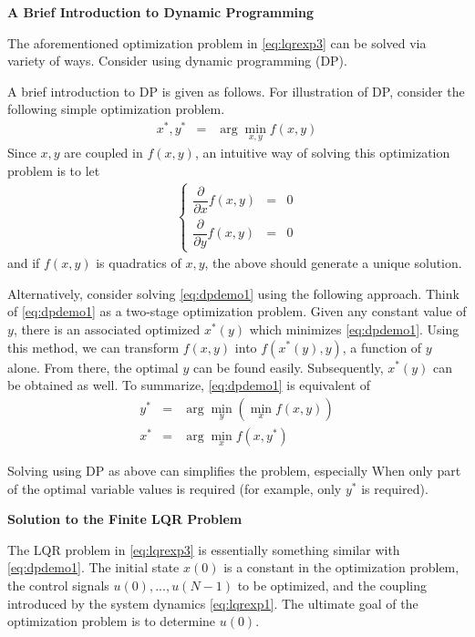 \vspace{0.1in}
\noindent \textbf{A Brief Introduction to Dynamic Programming}
\vspace{0.1in}

The aforementioned optimization problem in \eqref{eq:lqrexp3} can be solved via variety of ways. Consider using dynamic programming (DP).

A brief introduction to DP is given as follows. For illustration of DP, consider the following simple optimization problem.
\begin{eqnarray}
  x^*, y^* &=& \arg\min_{x,y} f(x, y) \label{eq:dpdemo1}
\end{eqnarray}
Since $x,y$ are coupled in $f(x,y)$, an intuitive way of solving this optimization problem is to let
\begin{eqnarray}
\left\{\begin{array}{ccc}
         \dfrac{\partial}{\partial x}f(x,y) & = & 0 \\
         \dfrac{\partial}{\partial y}f(x,y) & = & 0
       \end{array}\right. \nonumber
\end{eqnarray}
and if $f(x,y)$ is quadratics of $x, y$, the above should generate a unique solution.

Alternatively, consider solving \eqref{eq:dpdemo1} using the following approach. Think of \eqref{eq:dpdemo1} as a two-stage optimization problem. Given any constant value of $y$, there is an associated optimized $x^*(y)$ which minimizes \eqref{eq:dpdemo1}. Using this method, we can transform $f(x,y)$ into $f\left(x^*(y), y\right)$, a function of $y$ alone. From there, the optimal $y$ can be found easily. Subsequently, $x^*(y)$ can be obtained as well. To summarize, \eqref{eq:dpdemo1} is equivalent of
\begin{eqnarray}
y^* &=& \arg\min_{y}\left(\min_{x}f(x,y)\right) \nonumber \\
x^* &=& \arg\min_{x} f(x, y^*) \nonumber
\end{eqnarray}

Solving using DP as above can simplifies the problem, especially When only part of the optimal variable values is required (for example, only $y^*$ is required).

\vspace{0.1in}
\noindent \textbf{Solution to the Finite LQR Problem}
\vspace{0.1in}

The LQR problem in \eqref{eq:lqrexp3} is essentially something similar with \eqref{eq:dpdemo1}. The initial state $x(0)$ is a constant in the optimization problem, the control signals $u(0), ..., u(N-1)$ to be optimized, and the coupling introduced by the system dynamics \eqref{eq:lqrexp1}. The ultimate goal of the optimization problem is to determine $u(0)$.

